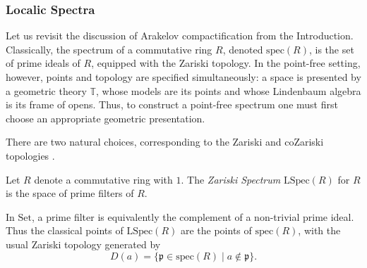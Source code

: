 \documentclass[a4paper, 11pt,reqno]{amsart}
\newcommand{\Set}{\mathrm{Set}}
\newcommand{\frap}{\mathfrak{p}}
\newcommand{\LSpec}{\mathrm{LSpec}}
\newcommand{\thT}{\mathbb{T}}
\newcommand{\Z}{\mathbb{Z}}
\newcommand{\spec}{\mathrm{spec}}
\begin{document}
\subsubsection{Localic Spectra}\label{subsec:localicprimes} Let us revisit the discussion of Arakelov compactification from the Introduction.  Classically, the spectrum of a commutative ring
$R$, denoted $\spec(R)$, is the set of prime ideals of $R$, equipped with the Zariski topology. In the point-free setting, however, points and topology are specified simultaneously: a space is presented by a  geometric theory $\thT$, whose models are its points and whose Lindenbaum
algebra is its frame of opens. Thus, to construct a point-free spectrum one
must first choose an appropriate geometric presentation.
\smallskip

There are two natural choices, corresponding to the Zariski and coZariski
topologies \cite{ColeSpectra,JohnstoneSpectra}. %


\begin{example}\label{ex:LSpec} Let $R$ denote a commutative ring with $1$. The \emph{Zariski Spectrum} $\LSpec(R)$ for $R$ is the space of prime filters of $R$.

In $\Set$, a prime filter is equivalently the
complement of a non-trivial prime ideal. Thus the classical points of
$\LSpec(R)$ are the points of $\spec(R)$, with the usual Zariski topology
generated by
\[
D(a)=\{\frap\in\spec(R)\mid a\notin\frap\}.
\]
\end{example}
\end{document}
